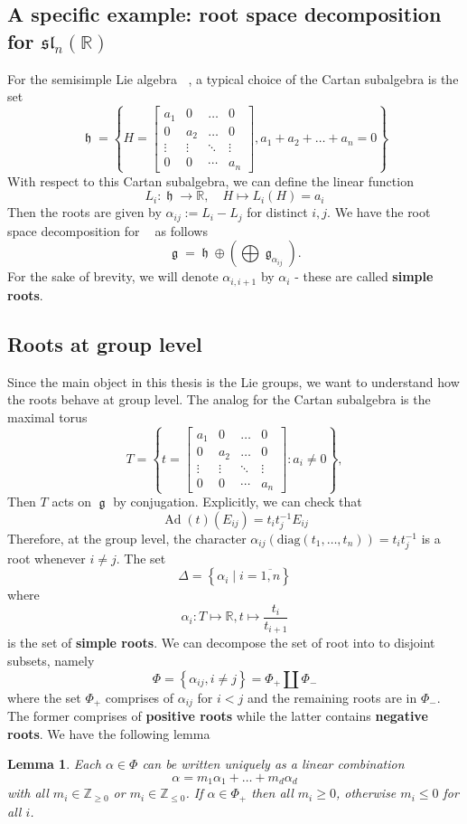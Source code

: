 \documentclass[12pt]{article} %
\newtheorem{lemma}[definition]{Lemma}
\DeclareMathOperator{\fg}{\mathfrak{g}}
\DeclareMathOperator{\fh}{\mathfrak{h}}
\DeclareMathOperator{\slnr}{\mathfrak{sl}_n(\mathbb{R})}
\DeclareMathOperator{\Ad}{\text{Ad}}
\begin{document}
\subsection{A specific example: root space decomposition for $\mathfrak{sl}_n(\mathbb{R})$}
For the semisimple Lie algebra $\slnr$, a typical choice of the Cartan subalgebra is the set
\[\fh = \left\lbrace H= \begin{bmatrix}
        a_1    & 0      & \ldots & 0      \\
        0      & a_2    & \ldots & 0      \\
        \vdots & \vdots & \ddots & \vdots \\
        0      & 0      & \cdots & a_n
    \end{bmatrix}, a_1 + a_2+ \ldots + a_n = 0\right\rbrace\]
With respect to this Cartan subalgebra, we can define the linear function
\[L_i \colon \fh \to \mathbb{R}, \quad H \mapsto L_i(H)= a_i\]
Then the roots are given by $\alpha_{ij} :=L_i - L_j$ for distinct $i,j$. We have the root space decomposition for $\slnr$ as follows
\[\fg = \fh \oplus \left(\bigoplus\fg_{\alpha_{ij}}\right).\]
For the sake of brevity, we will denote $\alpha_{i,i+1}$ by $\alpha_i$ - these are called \textbf{simple roots}.
\subsection{Roots at group level}
Since the main object in this thesis is the Lie groups, we want to understand how the roots
behave at group level. The analog for the Cartan subalgebra is the maximal torus
\[T = \left\lbrace t= \begin{bmatrix}
        a_1    & 0      & \ldots & 0      \\
        0      & a_2    & \ldots & 0      \\
        \vdots & \vdots & \ddots & \vdots \\
        0      & 0      & \cdots & a_n
    \end{bmatrix} :  a_i \ne 0\right\rbrace,\]
Then $T$ acts on $\fg$ by conjugation. Explicitly, we can check that
\[\Ad(t)(E_{ij}) = t_it_j^{-1}E_{ij}\]
Therefore, at the group level, the character $\alpha_{ij}(\text{diag}(t_1,\ldots,t_n))=t_it_j^{-1}$
is a root whenever $i \ne j$. The set
\[\Delta = \left\lbrace \alpha_i\mid i =\overline{1,n}\right\rbrace\]
where
\[\alpha_i \colon T \mapsto \mathbb{R}, t \mapsto \dfrac{t_i}{t_{i+1}}\]
is the set of \textbf{simple roots}.
We can decompose the set of root into to disjoint subsets, namely
\[\Phi = \left\lbrace \alpha_{ij}, i \ne j\right\rbrace = \Phi_+ \coprod \Phi_{-}\]
where the set $\Phi_+$ comprises of $\alpha_{ij}$ for $i<j$ and the remaining roots are in $\Phi_{-}$. The former comprises of
\textbf{positive roots} while the latter contains \textbf{negative roots}. We have the following lemma
\begin{lemma}\label{linear-comb-of-roots}
    Each $\alpha \in \Phi$ can be written uniquely as a linear combination
    \[\alpha = m_1\alpha_1+\ldots+m_{d}\alpha_{d}\]
    with all $m_i \in \mathbb{Z}_{\ge 0}$ or $m_i \in \mathbb{Z}_{\le 0}$. If $\alpha \in \Phi_+$ then all $m_i \ge 0$, otherwise $m_i \le 0$ for all $i$.
\end{lemma}
\end{document}
